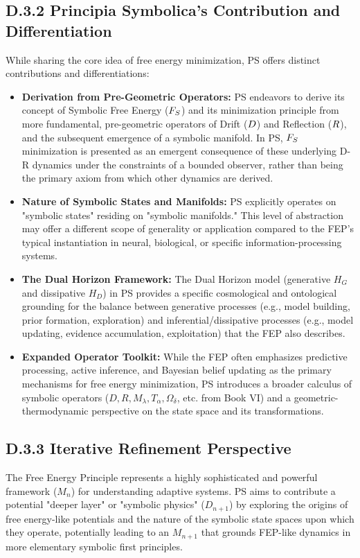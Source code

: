 \subsection*{D.3.2 Principia Symbolica's Contribution and Differentiation} \label{subsec:appD_fep_contribution_differentiation}
While sharing the core idea of free energy minimization, PS offers distinct contributions and differentiations:
\begin{itemize}
    \item \textbf{Derivation from Pre-Geometric Operators:} PS endeavors to derive its concept of Symbolic Free Energy (\(F_S\)) and its minimization principle from more fundamental, pre-geometric operators of Drift (\(D\)) and Reflection (\(R\)), and the subsequent emergence of a symbolic manifold. In PS, \(F_S\) minimization is presented as an emergent consequence of these underlying D-R dynamics under the constraints of a bounded observer, rather than being the primary axiom from which other dynamics are derived.
    \item \textbf{Nature of Symbolic States and Manifolds:} PS explicitly operates on "symbolic states" residing on "symbolic manifolds." This level of abstraction may offer a different scope of generality or application compared to the FEP's typical instantiation in neural, biological, or specific information-processing systems.
    \item \textbf{The Dual Horizon Framework:} The Dual Horizon model (generative \(H_G\) and dissipative \(H_D\)) in PS provides a specific cosmological and ontological grounding for the balance between generative processes (e.g., model building, prior formation, exploration) and inferential/dissipative processes (e.g., model updating, evidence accumulation, exploitation) that the FEP also describes.
    \item \textbf{Expanded Operator Toolkit:} While the FEP often emphasizes predictive processing, active inference, and Bayesian belief updating as the primary mechanisms for free energy minimization, PS introduces a broader calculus of symbolic operators (\(D, R, M_\lambda, T_\alpha, \Omega_\delta\), etc. from Book VI) and a geometric-thermodynamic perspective on the state space and its transformations.
\end{itemize}
\subsection*{D.3.3 Iterative Refinement Perspective}
\label{subsec:appD_fep_iterative_refinement_perspective}
The Free Energy Principle represents a highly sophisticated and powerful framework (\(M_n\)) for understanding adaptive systems. PS aims to contribute a potential "deeper layer" or "symbolic physics" (\(D_{n+1}\)) by exploring the origins of free energy-like potentials and the nature of the symbolic state spaces upon which they operate, potentially leading to an \(M_{n+1}\) that grounds FEP-like dynamics in more elementary symbolic first principles.
